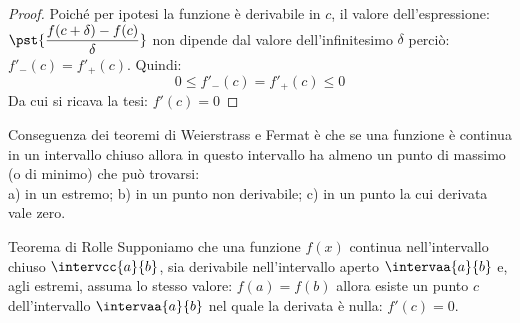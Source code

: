 \begin{proof}

Poiché per ipotesi la funzione è derivabile in \(c\), il valore 
dell'espressione: \(\pst{\dfrac{f(c+\delta) - f(c)}{\delta}}\) non dipende 
dal valore dell'infinitesimo \(\delta\) perciò: \(f'_-(c) = f'_+(c)\). 
Quindi:
\[0 \leqslant f'_-(c) = f'_+(c) \leqslant 0\]
Da cui si ricava la tesi:
\hspace{26mm}\(f'(c) = 0\)
\end{proof}

Conseguenza dei teoremi di Weierstrass e Fermat è che se una funzione è 
continua in un intervallo chiuso allora in questo intervallo ha almeno un 
punto di massimo (o di minimo) che può trovarsi:\\
a) in un estremo; \quad b) in un punto non derivabile; \quad
c) in un punto la cui derivata vale zero.\\
\begin{center} \estremo \nonder \derzero \end{center}

\vspace{-15mm}                           %

\begin{newtheo}{Teorema di Rolle}{}
Supponiamo che una funzione \(f(x)\) continua nell'intervallo chiuso
\(\intervcc{a}{b}\),
sia derivabile nell'intervallo aperto
\(\intervaa{a}{b}\) 
e, agli estremi, assuma lo stesso valore: \(f(a) = f(b)\) allora
esiste un punto \(c\) dell'intervallo \(\intervaa{a}{b}\) nel quale 
la derivata è nulla: \qquad \(f'(c)=0\).

\end{newtheo}

